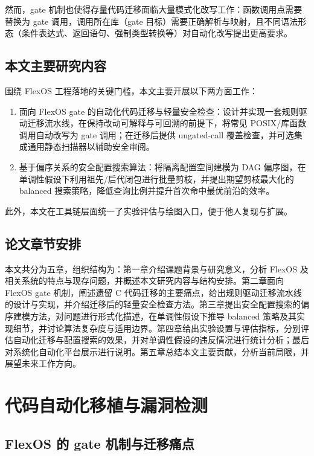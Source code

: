 \documentclass[UTF8,a4paper,12pt,twoside]{ctexart}  %
\begin{document}
然而，gate
机制也使得存量代码迁移面临大量模式化改写工作：函数调用点需要替换为 gate
调用，调用所在库（gate
目标）需要正确解析与映射，且不同语法形态（条件表达式、返回语句、强制类型转换等）对自动化改写提出更高要求。

\subsection{本文主要研究内容}

围绕 FlexOS 工程落地的关键门槛，本文主要开展以下两方面工作：
\begin{enumerate}
\def\labelenumi{\arabic{enumi}.}
\item
  面向 FlexOS gate
  的自动化代码迁移与轻量安全检查：设计并实现一套规则驱动迁移流水线，在保持改动可解释与可回溯的前提下，将常见
  POSIX/库函数调用自动改写为 gate 调用；在迁移后提供 ungated-call
  覆盖检查，并可选集成通用静态扫描器以辅助安全审阅。
\item
  基于偏序关系的安全配置搜索算法：将隔离配置空间建模为 DAG
  偏序图，在单调性假设下利用祖先/后代闭包进行批量剪枝，并提出期望剪枝最大化的
  balanced 搜索策略，降低查询比例并提升首次命中最优前沿的效率。
\end{enumerate}

此外，本文在工具链层面统一了实验评估与绘图入口，便于他人复现与扩展。

\subsection{论文章节安排}

本文共分为五章，组织结构为：第一章介绍课题背景与研究意义，分析 FlexOS
及相关系统的特点与现存问题，并概述本文研究内容与结构安排。第二章面向
FlexOS gate 机制，阐述遗留 C
代码迁移的主要痛点，给出规则驱动迁移流水线的设计与实现，并介绍迁移后的轻量安全检查方法。第三章提出安全配置搜索的偏序建模方法，对问题进行形式化描述，在单调性假设下推导
balanced
策略及其实现细节，并讨论算法复杂度与适用边界。第四章给出实验设置与评估指标，分别评估自动化迁移与配置搜索的效果，并对单调性假设的违反情况进行统计分析；最后对系统化自动化平台展示进行说明。第五章总结本文主要贡献，分析当前局限，并展望未来工作方向。

\newpage
\section{代码自动化移植与漏洞检测}

\subsection{FlexOS 的 gate
机制与迁移痛点}
\end{document}
